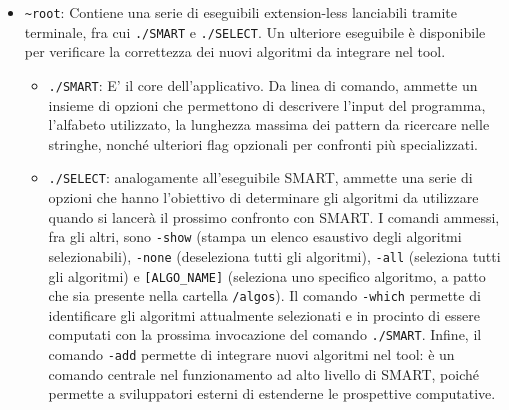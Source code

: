 \begin{itemize}
    \item \verb|~root|: Contiene una serie di eseguibili extension-less lanciabili tramite terminale, fra cui \verb|./SMART| e \verb|./SELECT|. Un ulteriore eseguibile è disponibile per verificare la correttezza dei nuovi algoritmi da integrare nel tool.
    \begin{itemize}
        \item \verb|./SMART|: E' il core dell'applicativo. Da linea di comando, ammette un insieme di opzioni che permettono di descrivere l'input del programma, l'alfabeto utilizzato, la lunghezza massima dei pattern da ricercare nelle stringhe, nonché ulteriori flag opzionali per confronti più specializzati.
        \item \verb|./SELECT|: analogamente all'eseguibile SMART, ammette una serie di opzioni che hanno l'obiettivo di determinare gli algoritmi da utilizzare quando si lancerà il prossimo confronto con SMART. I comandi ammessi, fra gli altri, sono \verb|-show| (stampa un elenco esaustivo degli algoritmi selezionabili), \verb|-none| (deseleziona tutti gli algoritmi), \verb|-all| (seleziona tutti gli algoritmi) e \verb|[ALGO_NAME]| (seleziona uno specifico algoritmo, a patto che sia presente nella cartella \verb|/algos|). Il comando \verb|-which| permette di identificare gli algoritmi attualmente selezionati e in procinto di essere computati con la prossima invocazione del comando \verb|./SMART|. Infine, il comando \verb|-add| permette di integrare nuovi algoritmi nel tool: è un comando centrale nel funzionamento ad alto livello di SMART, poiché permette a sviluppatori esterni di estenderne le prospettive computative.
        

\end{itemize}
\end{itemize}
